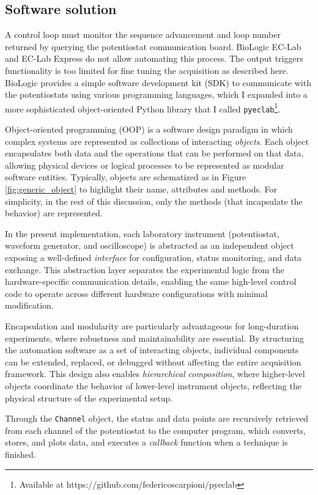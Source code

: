 \subsection{Software solution}
A control loop must monitor the sequence advancement and loop number returned by querying the potentiostat communication board.
BioLogic EC-Lab and EC-Lab Express do not allow automating this process. The output triggers functionality is too limited for fine tuning the acquisition as described here.
BioLogic provides a simple software development kit (SDK) to communicate with the potentiostats using various programming languages, which I expanded into a more sophisticated object-oriented Python library that I called \verb|pyeclab|\footnote{Available at https://github.com/federicoscarpioni/pyeclab}.

Object-oriented programming (OOP) is a software design paradigm in which complex systems are represented as collections of interacting \emph{objects}.  
Each object encapsulates both data and the operations that can be performed on that data, allowing physical devices or logical processes to be represented as modular software entities. 
Typically, objects are schematized as in Figure \ref{fig:generic_object} to highlight their name, attributes and methods.
For simplicity, in the rest of this discussion, only the methods (that incapsulate the behavior) are represented.

In the present implementation, each laboratory instrument (potentiostat, waveform generator, and oscilloscope) is abstracted as an independent object exposing a well-defined \emph{interface} for configuration, status monitoring, and data exchange.  
This abstraction layer separates the experimental logic from the hardware-specific communication details, enabling the same high-level control code to operate across different hardware configurations with minimal modification.

Encapsulation and modularity are particularly advantageous for long-duration experiments, where robustness and maintainability are essential.  
By structuring the automation software as a set of interacting objects, individual components can be extended, replaced, or debugged without affecting the entire acquisition framework.  
This design also enables \emph{hierarchical composition}, where higher-level objects coordinate the behavior of lower-level instrument objects, reflecting the physical structure of the experimental setup.

Through the \verb|Channel| object, the status and data points are recursively retrieved from each channel of the potentiostat to the computer program, which converts, stores, and plots data, and executes a \emph{callback} function when a technique is finished.

